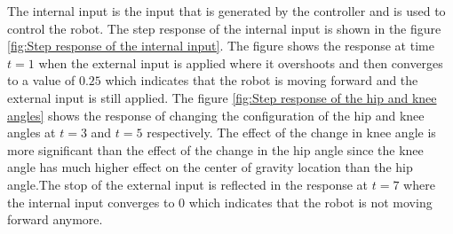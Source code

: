 The internal input is the input that is generated by the controller and is used to control the robot.
The step response of the internal input is shown in the figure \ref{fig:Step response of the internal input}. The figure shows the response at time $t=1$ when the external input is applied where it overshoots and then converges to a value of $0.25$ which indicates that the robot is moving forward and the external input is still applied. The figure \ref{fig:Step response of the hip and knee angles} shows the response of changing the configuration of the hip and knee angles  at $t=3$ and $t=5$ respectively. The effect of the change in knee angle is more significant than the effect of the change in the hip angle since the knee angle has much higher effect on the center of gravity location than the hip angle.The stop of the external input is reflected in the response at $t=7$ where the internal input converges to $0$ which indicates that the robot is not moving forward anymore.

